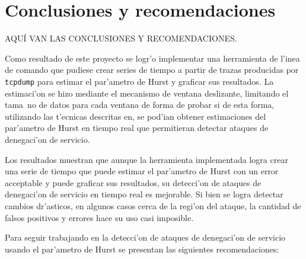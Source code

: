 \chapter{Conclusiones y recomendaciones} \label{chap:conclusiones}

AQU\'I VAN LAS CONCLUSIONES Y RECOMENDACIONES.
\vspace{5 mm}

Como resultado de este proyecto se logr'o implementar una herramienta de
l'inea de comando que pudiese crear series de tiempo a partir de trazas
producidas por {\tt tcpdump} para estimar el par'ametro de Hurst y graficar sus
resultados. La estimaci'on se hizo mediante el mecanismo de ventana deslizante,
limitando el tama~no de datos para cada ventana de forma de probar si de esta
forma, utilizando las t'ecnicas descritas en, se pod'ian obtener estimaciones del
par'ametro de Hurst en tiempo real que permitieran detectar ataques de
denegaci'on de servicio.

Los resultados muestran que aunque la herramienta implementada logra
crear una serie de tiempo que puede estimar el par'ametro de Hurst con un
error acceptable y puede graficar sus resultados, su detecci'on de ataques
de denegaci'on de servicio en tiempo real es mejorable. Si bien se logra
detectar cambios dr'asticos, en algunos casos cerca de la regi'on del ataque,
la cantidad de falsos positivos y errores hace su uso casi imposible. 

Para seguir trabajando en la detecci'on de ataques de denegaci'on de servicio
usando el par'ametro de Hurst se presentan las siguientes recomendaciones: 

